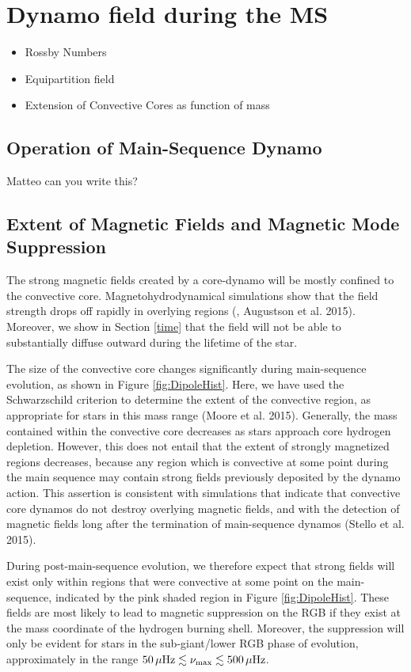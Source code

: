 \section{Dynamo field during the MS}
\begin{itemize}
\item Rossby Numbers
\item Equipartition field
\item Extension of Convective Cores as function of mass
\end{itemize}


\subsection{Operation of Main-Sequence Dynamo}

Matteo can you write this?

\subsection{Extent of Magnetic Fields and Magnetic Mode Suppression}

The strong magnetic fields created by a core-dynamo will be mostly confined to the convective core. Magnetohydrodynamical simulations show that the field strength drops off rapidly in overlying regions (\citealt{Featherstone_2009}, Augustson et al. 2015). Moreover, we show in Section \ref{time} that the field will not be able to substantially diffuse outward during the lifetime of the star. 

The size of the convective core changes significantly during main-sequence evolution, as shown in Figure \ref{fig:DipoleHist}. Here, we have used the Schwarzschild criterion to determine the extent of the convective region, as appropriate for stars in this mass range (Moore et al. 2015). Generally, the mass contained within the convective core decreases as stars approach core hydrogen depletion. However, this does not entail that the extent of strongly magnetized regions decreases, because any region which is convective at some point during the main sequence may contain strong fields previously deposited by the dynamo action. This assertion is consistent with simulations \citep{Featherstone_2009} that indicate that convective core dynamos do not destroy overlying magnetic fields, and with the detection of magnetic fields long after the termination of main-sequence dynamos (Stello et al. 2015).

During post-main-sequence evolution, we therefore expect that strong fields will exist only within regions that were convective at some point on the main-sequence, indicated by the pink shaded region in Figure \ref{fig:DipoleHist}. These fields are most likely to lead to magnetic suppression on the RGB if they exist at the mass coordinate of the hydrogen burning shell. Moreover, the suppression will only be evident for stars in the sub-giant/lower RGB phase of evolution, approximately in the range $50 \, \mu {\rm Hz} \lesssim \nu_{\rm max} \lesssim 500 \, \mu {\rm Hz}$.

